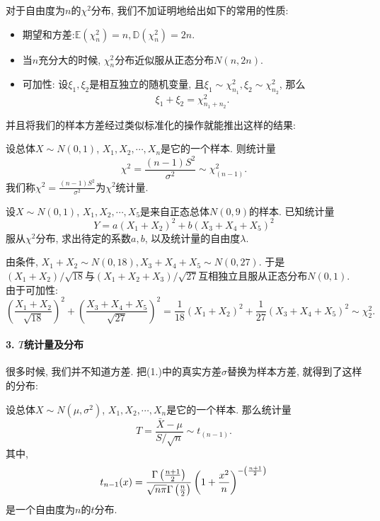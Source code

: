对于自由度为$n$的$\chi^2$分布, 我们不加证明地给出如下的常用的性质:
\begin{theorem}
    \begin{itemize}
        \item 期望和方差:$\mathbb E (\chi^2_n)=n, \mathbb D(\chi^2_n)=2n$.
        \item 当$n$充分大的时候, $\chi^2_n$分布近似服从正态分布$N(n, 2n)$.
        \item 可加性: 设$\xi_1, \xi_2$是相互独立的随机变量, 且$\xi_1 \sim \chi^2_{n_1}, \xi_2 \sim \chi^2_{n_2}$, 那么$$\xi_1+\xi_2=\chi_{n_1+n_2}^2.$$
    \end{itemize}
\end{theorem}

并且将我们的样本方差经过类似标准化的操作就能推出这样的结果: 

\begin{theorem}
    设总体$X\sim N(0, 1)$, $X_1, X_2, \cdots, X_n$是它的一个样本. 则统计量
    $$
    \chi^2 = \frac{(n-1)S^2}{\sigma^2}\sim \chi^2_{(n-1)}.
    $$ 
    我们称$\chi^2=\frac{(n-1)S^2}{\sigma^2}$为$\chi^2$统计量. 
\end{theorem}

\begin{example}
    设$X\sim N(0, 1)$, $X_1, X_2, \cdots, X_5$是来自正态总体$N(0, 9)$的样本. 已知统计量
    $$
    Y=a(X_1+X_2)^2 +b(X_3+X_4+X_5)^2
    $$
    服从$\chi^2$分布, 求出待定的系数$a,b$, 以及统计量的自由度$\lambda$. 
\end{example}

\begin{solution}
    由条件, $X_1+X_2\sim N(0, 18), X_3+X_4+X_5\sim N(0, 27)$. 于是$(X_1+X_2)/\sqrt{18}$与$(X_1+X_2+X_3)/\sqrt{27}$互相独立且服从正态分布$N(0,1 )$. 由于可加性: 
    $$
    \left(
        \frac{X_1+X_2}{\sqrt{18}}
    \right)^2 + 
    \left(
        \frac{X_3+X_4+X_5}{\sqrt{27}}
    \right)^2 = 
    \frac{1}{18}(X_1+X_2)^2+\frac 1{27}(X_3+X_4+X_5)^2\sim \chi^2_2.
    $$
\end{solution}

\paragraph{3. $T$统计量及分布}

很多时候, 我们并不知道方差. 把(1.)中的真实方差$\sigma$替换为样本方差, 就得到了这样的分布: 

\begin{definition}
    设总体$X\sim N(\mu, \sigma^2)$, $X_1, X_2, \cdots, X_n$是它的一个样本. 那么统计量
    $$
    T = \frac{\bar X-\mu }{S/\sqrt n} \sim t_{(n-1)}.
    $$
    其中, 
    $$
    t_{n-1}(x)=
    \frac{
        \Gamma \left(
            \frac{n+1}{2}
        \right)
    }{
        \sqrt{n\pi} \Gamma \left(\frac n2\right)
    }\left(
        1+\frac{x^2}{n}
    \right)^{-\left(
        n+1\over 2
    \right)}
    $$是一个自由度为$n$的$t$分布. 
\end{definition}

